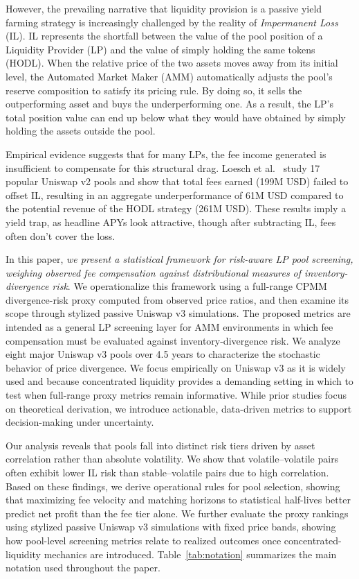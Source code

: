 \documentclass[10pt,conference,compsocconf]{IEEEtran}
\begin{document}
However, the prevailing narrative that liquidity provision is a passive yield farming strategy is increasingly challenged by the reality of \textit{Impermanent Loss} (IL). IL represents the shortfall between the value of the pool position of a Liquidity Provider (LP) and the value of simply holding the same tokens (HODL). When the relative price of the two assets moves away from its initial level, the Automated Market Maker (AMM) automatically adjusts the pool’s reserve composition to satisfy its pricing rule. 
By doing so, it sells the outperforming asset and buys the underperforming one. 
As a result, the LP's total position value can end up below what they would have obtained by simply holding the assets outside the pool.

Empirical evidence suggests that for many LPs, the fee income generated is insufficient to compensate for this structural drag. 
Loesch et al.~\cite{loesch2021impermanent} study 17 popular Uniswap v2 pools and show that total fees earned (199M USD) failed to offset IL, resulting in an aggregate underperformance of 61M USD compared to the potential revenue of the HODL strategy (261M USD). 
These results imply a yield trap, as headline APYs look attractive, though after subtracting IL, fees often don’t cover the loss.

In this paper, \textit{we present a statistical framework for risk-aware LP pool screening, weighing observed fee compensation against distributional measures of inventory-divergence risk}. 
We operationalize this framework using a full-range CPMM divergence-risk proxy computed from observed price ratios, and then examine its scope through stylized passive Uniswap v3 simulations.
The proposed metrics are intended as a general LP screening layer for AMM environments in which fee compensation must be evaluated against inventory-divergence risk.
We analyze eight major Uniswap v3 pools over 4.5 years to characterize the stochastic behavior of price divergence. 
We focus empirically on Uniswap v3 as it is widely used and because concentrated liquidity provides a demanding setting in which to test when full-range proxy metrics remain informative.
While prior studies focus on theoretical derivation, we introduce actionable, data-driven metrics to support decision-making under uncertainty.

Our analysis reveals that pools fall into distinct risk tiers driven by asset correlation rather than absolute volatility. We show that volatile--volatile pairs often exhibit lower IL risk than stable--volatile pairs due to high correlation. Based on these findings, we derive operational rules for pool selection, showing that maximizing fee velocity and matching horizons to statistical half-lives better predict net profit than the fee tier alone.
We further evaluate the proxy rankings using stylized passive Uniswap v3 simulations with fixed price bands, showing how pool-level screening metrics relate to realized outcomes once concentrated-liquidity mechanics are introduced. 
Table~\ref{tab:notation} summarizes the main notation used throughout the paper.
\end{document}

